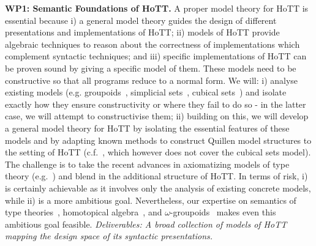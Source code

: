 \documentclass[a4paper,11pt]{article}
\begin{document}



{\bf WP1: Semantic Foundations of HoTT.}  %
A proper model theory for
HoTT is essential because i) a general model theory 
guides the design of different presentations and implementations of
HoTT; ii) models of HoTT provide algebraic techniques to reason
about the correctness of implementations which complement syntactic
techniques; and iii) specific implementations of HoTT can
be proven sound by giving a specific model of them.  These models
need to be constructive so that all programs reduce to a normal form.
We will: i) analyse existing models ({e.g.}
groupoids~\cite{HofmannM:groitt}, simplicial
sets~\cite{KapulkinC:simmuv}, cubical sets~\cite{BezemM:cubsmt}) and
isolate exactly how they ensure constructivity or where they fail to
do so - in the latter case, we will attempt to constructivise them;
ii) building on this, we will develop a general model theory for HoTT
by isolating the essential features of these models and by adapting
known methods to construct Quillen model structures to the setting of
HoTT ({c.f.}~\cite{ShulmanM:uniidh}, which however does not cover the
cubical sets model).  The challenge is to take the recent advances in
axiomatizing models of type theory
({e.g.}~\cite{AwodeyS:natmtt}) and blend in the additional structure of HoTT. In terms
of risk, i) is certainly achievable as it involves only the
analysis of existing concrete models, while ii) is a more ambitious
goal. Nevertheless, our expertise on semantics of type
theories~\cite{neil2014relParamDep}, homotopical
algebra~\cite{GambinoN:homl2c,GambinoN:weilsh}, and
$\omega$-groupoids~\cite{alti:csl12} makes even this ambitious goal
feasible. {\em Deliverables: A broad collection of models of HoTT
mapping the design space of its syntactic presentations.
}
\end{document}
